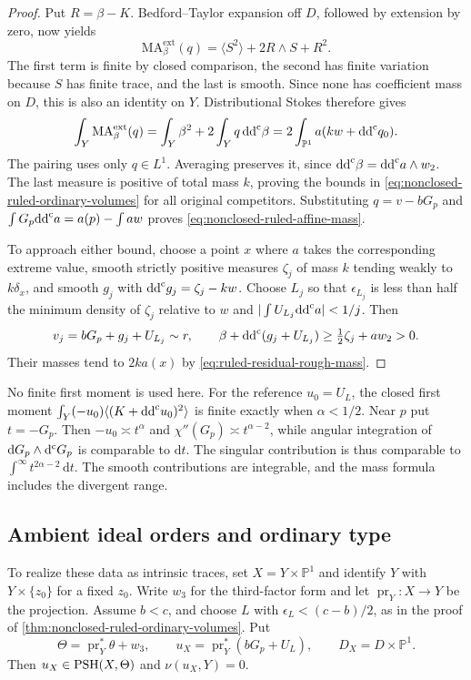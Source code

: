 \begin{proof}
Put $R=\beta-K$. Bedford--Taylor expansion off $D$, followed by extension by zero, now yields
\[
 \mathrm{MA}^{\mathrm{ext}}_\beta(q)
     =\langle S^2\rangle+2R\wedge S+R^2.
\]
The first term is finite by closed comparison, the second has finite variation because $S$ has finite trace, and the last is smooth. Since none has coefficient mass on $D$, this is also an identity on $Y$. Distributional Stokes therefore gives
\begin{equation}\label{eq:ruled-residual-rough-mass}
 \int_Y\mathrm{MA}^{\mathrm{ext}}_\beta(q)
 =\int_Y\beta^2+2\int_Yq\,\mathrm{dd}^{\mathrm{c}}\beta
 =2\int_{\mathbb P^1}a(kw+\mathrm{dd}^{\mathrm{c}} q_0).
\end{equation}
The pairing uses only $q\in L^1$. Averaging preserves it, since $\mathrm{dd}^{\mathrm{c}}\beta=\mathrm{dd}^{\mathrm{c}} a\wedge w_2$. The last measure is positive of total mass $k$, proving the bounds in \eqref{eq:nonclosed-ruled-ordinary-volumes} for all original competitors. Substituting $q=v-bG_p$ and $\int G_p\mathrm{dd}^{\mathrm{c}} a=a(p)-\int aw$ proves \eqref{eq:nonclosed-ruled-affine-mass}.

To approach either bound, choose a point $x$ where $a$ takes the corresponding extreme value, smooth strictly positive measures $\zeta_j$ of mass $k$ tending weakly to $k\delta_x$, and smooth $g_j$ with $\mathrm{dd}^{\mathrm{c}} g_j=\zeta_j-kw$. Choose $L_j$ so that $\epsilon_{L_j}$ is less than half the minimum density of $\zeta_j$ relative to $w$ and $|\int U_{L_j}\mathrm{dd}^{\mathrm{c}} a|<1/j$. Then
\[
 v_j=bG_p+g_j+U_{L_j}\sim r,\qquad
 \beta+\mathrm{dd}^{\mathrm{c}}(g_j+U_{L_j})\geq\tfrac12\zeta_j+aw_2>0.
\]
Their masses tend to $2ka(x)$ by \eqref{eq:ruled-residual-rough-mass}.
\end{proof}

No finite first moment is used here. For the reference $u_0=U_L$, the closed first moment $\int_Y(-u_0)\langle(K+\mathrm{dd}^{\mathrm{c}} u_0)^2\rangle$ is finite exactly when $\alpha<1/2$. Near $p$ put $t=-G_p$. Then $-u_0\asymp t^\alpha$ and $\chi''(G_p)\asymp t^{\alpha-2}$, while angular integration of $\mathrm dG_p\wedge\mathrm d^{\mathrm c} G_p$ is comparable to $\mathrm dt$. The singular contribution is thus comparable to $\int^\infty t^{2\alpha-2}\,\mathrm dt$. The smooth contributions are integrable, and the mass formula includes the divergent range.

\subsection{Ambient ideal orders and ordinary type}

To realize these data as intrinsic traces, set $X=Y\times\mathbb P^1$ and identify $Y$ with $Y\times\{z_0\}$ for a fixed $z_0$. Write $w_3$ for the third-factor form and let $\operatorname{pr}_Y\colon X\to Y$ be the projection. Assume $b<c$, and choose $L$ with $\epsilon_L<(c-b)/2$, as in the proof of \cref{thm:nonclosed-ruled-ordinary-volumes}. Put
\[
 \Theta=\operatorname{pr}_Y^*\theta+w_3,
 \qquad u_X=\operatorname{pr}_Y^*(bG_p+U_L),
 \qquad D_X=D\times\mathbb P^1.
\]
Then $u_X\in\mathrm{PSH}(X,\Theta)$ and $\nu(u_X,Y)=0$.

